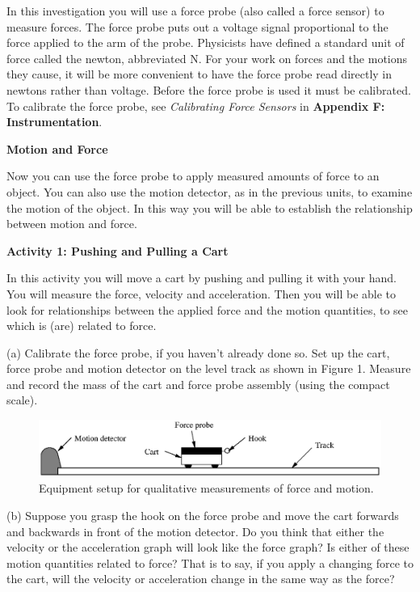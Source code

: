 In this investigation you will use a force probe (also called a force sensor) to measure forces. The force probe puts out a voltage signal proportional to the force applied to the arm of the probe. Physicists have defined a standard unit of force called the newton, abbreviated N. For your work on forces and the motions they cause, it will be more convenient to have the force probe read directly in newtons rather than voltage. Before the force probe is used it must be calibrated. To calibrate the force probe, see \textit{Calibrating Force Sensors} in \textbf{Appendix F: Instrumentation}.

\textbf{Motion and Force} 

Now you can use the force probe to apply measured amounts of force to an object.
You can also use the motion detector, as in the previous units, to examine the
motion of the object. In this way you will be able to establish the relationship
between motion and force.
\vspace{10mm}

\textbf{Activity 1: Pushing and Pulling a Cart} 

In this activity you will move a cart by pushing and pulling it with your hand.
You will measure the force, velocity and acceleration. Then you will be able
to look for relationships between the applied force and the motion quantities,
to see which is (are) related to force.

(a) Calibrate the force probe, if you haven't already done so. Set up the cart, force probe and motion detector on the level track as shown in Figure 1. Measure and record the mass of the cart and force probe assembly (using the compact scale).

\vspace{10mm}

\begin{figure}
{\par\centering \includegraphics{force1_fig1.eps} \par}


\caption{Equipment setup for qualitative measurements of force and motion.}
\end{figure}


(b) Suppose you grasp the hook on the force probe and move the cart forwards
and backwards in front of the motion detector. Do you think that either the
velocity or the acceleration graph will look like the force graph? Is either
of these motion quantities related to force? That is to say, if you apply a
changing force to the cart, will the velocity or acceleration change in the
same way as the force?
\vspace{30mm}


